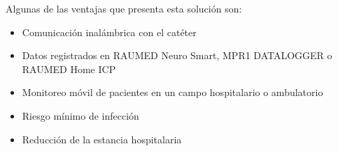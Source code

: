 Algunas de las ventajas que presenta esta solución son:
\begin{itemize}
    \item Comunicación inalámbrica con el catéter
    \item Datos registrados en RAUMED Neuro Smart, MPR1 DATALOGGER o RAUMED Home ICP
    \item Monitoreo móvil de pacientes en un campo hospitalario o ambulatorio
    \item Riesgo mínimo de infección
    \item Reducción de la estancia hospitalaria
\end{itemize}


